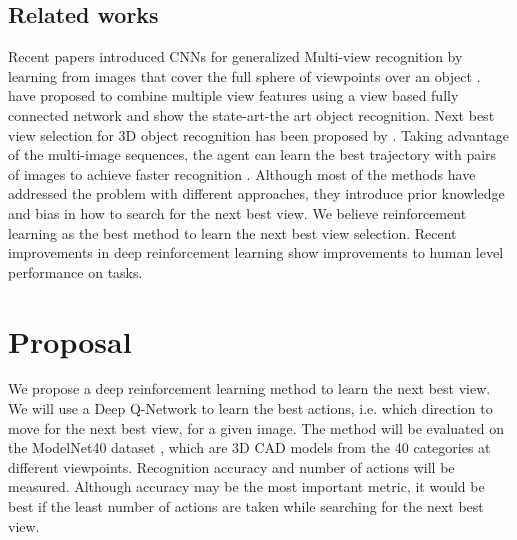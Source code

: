 \documentclass[10pt,twocolumn,letterpaper]{article}
\begin{document}
\subsection{Related works}
	Recent papers introduced CNNs for generalized Multi-view recognition by learning from images that cover the full sphere of viewpoints over an object \cite{DBLP:journals/corr/JayaramanG16} \cite{DBLP:journals/corr/SuMKL15}. \cite{DBLP:journals/corr/WuSKTX14} have proposed to combine multiple view features using a view based fully connected network and show the state-art-the art object recognition. Next best view selection for 3D object recognition has been proposed by \cite{DBLP:journals/corr/WuSKTX14}. Taking advantage of the multi-image sequences, the agent can learn the best trajectory with pairs of images to achieve faster recognition \cite{DBLP:journals/corr/JohnsLD16}. Although most of the methods have addressed the problem with different approaches, they introduce prior knowledge and bias in how to search for the next best view. We believe reinforcement learning as the best method to learn the next best view selection. Recent improvements in deep reinforcement learning \cite{DBLP:journals/corr/MnihKSGAWR13} show improvements to human level performance on tasks.

\section{Proposal}
	We propose a deep reinforcement learning method to learn the next best view. We will use a Deep Q-Network \cite{DBLP:journals/corr/MnihKSGAWR13} to learn the best actions, i.e. which direction to move for the next best view, for a given image. The method will be evaluated on the ModelNet40 dataset \cite{DBLP:journals/corr/WuSKTX14}, which are 3D CAD models from the 40 categories at different viewpoints. Recognition accuracy and number of actions will be measured. Although accuracy may be the most important metric, it would be best if the least number of actions are taken while searching for the next best view.

{\small


}
\end{document}
